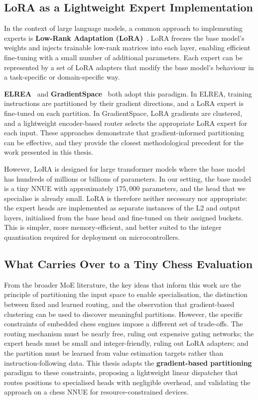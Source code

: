 \subsection{LoRA as a Lightweight Expert Implementation}\label{sec:lora}

In the context of large language models, a common approach to implementing experts is \textbf{Low-Rank Adaptation (LoRA)}~\cite{hu2022lora}. LoRA freezes the base model's weights and injects trainable low-rank matrices into each layer, enabling efficient fine-tuning with a small number of additional parameters. Each expert can be represented by a set of LoRA adapters that modify the base model's behaviour in a task-specific or domain-specific way.

\textbf{ELREA}~\cite{li2025elrea} and \textbf{GradientSpace}~\cite{sridharan2025gradientspace} both adopt this paradigm. In ELREA, training instructions are partitioned by their gradient directions, and a LoRA expert is fine-tuned on each partition. In GradientSpace, LoRA gradients are clustered, and a lightweight encoder-based router selects the appropriate LoRA expert for each input. These approaches demonstrate that gradient-informed partitioning can be effective, and they provide the closest methodological precedent for the work presented in this thesis.

However, LoRA is designed for large transformer models where the base model has hundreds of millions or billions of parameters. In our setting, the base model is a tiny NNUE with approximately \(175{,}000\) parameters, and the head that we specialise is already small. LoRA is therefore neither necessary nor appropriate: the expert heads are implemented as separate instances of the L2 and output layers, initialised from the base head and fine-tuned on their assigned buckets. This is simpler, more memory-efficient, and better suited to the integer quantisation required for deployment on microcontrollers.

\subsection{What Carries Over to a Tiny Chess Evaluation}\label{sec:moe-carryover}

From the broader MoE literature, the key ideas that inform this work are the principle of partitioning the input space to enable specialisation, the distinction between fixed and learned routing, and the observation that gradient-based clustering can be used to discover meaningful partitions. However, the specific constraints of embedded chess engines impose a different set of trade-offs. The routing mechanism must be nearly free, ruling out expensive gating networks; the expert heads must be small and integer-friendly, ruling out LoRA adapters; and the partition must be learned from value estimation targets rather than instruction-following data. This thesis adapts the \textbf{gradient-based partitioning} paradigm to these constraints, proposing a lightweight linear dispatcher that routes positions to specialised heads with negligible overhead, and validating the approach on a chess NNUE for resource-constrained devices.


